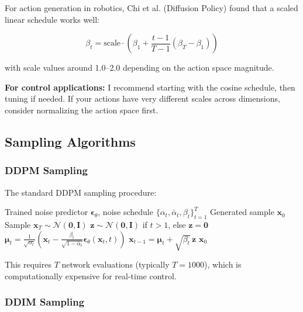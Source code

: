 For action generation in robotics, Chi et al. (Diffusion Policy) found that a scaled linear schedule works well:

\begin{equation}
\beta_t = \text{scale} \cdot \left(\beta_1 + \frac{t-1}{T-1}(\beta_T - \beta_1)\right)
\label{eq:scaled_linear}
\end{equation}

with scale values around 1.0--2.0 depending on the action space magnitude.

\textbf{For control applications:} I recommend starting with the cosine schedule, then tuning if needed. If your actions have very different scales across dimensions, consider normalizing the action space first.

\subsection{Sampling Algorithms}
\label{subsec:sampling_algorithms}

\subsubsection{DDPM Sampling}

The standard DDPM sampling procedure:

\begin{algorithm}[H]
\caption{DDPM Sampling}
\label{alg:ddpm_sampling}
\begin{algorithmic}[1]
\REQUIRE Trained noise predictor $\boldsymbol{\epsilon}_\theta$, noise schedule $\{\alpha_t, \bar{\alpha}_t, \beta_t\}_{t=1}^T$
\ENSURE Generated sample $\mathbf{x}_0$
\STATE Sample $\mathbf{x}_T \sim \mathcal{N}(\mathbf{0}, \mathbf{I})$
    \STATE $\mathbf{z} \sim \mathcal{N}(\mathbf{0}, \mathbf{I})$ if $t > 1$, else $\mathbf{z} = \mathbf{0}$
    \STATE $\boldsymbol{\mu}_t = \frac{1}{\sqrt{\alpha_t}}\left(\mathbf{x}_t - \frac{\beta_t}{\sqrt{1-\bar{\alpha}_t}}\boldsymbol{\epsilon}_\theta(\mathbf{x}_t, t)\right)$
    \STATE $\mathbf{x}_{t-1} = \boldsymbol{\mu}_t + \sqrt{\beta_t}\,\mathbf{z}$
\ENDFOR
\RETURN $\mathbf{x}_0$
\end{algorithmic}
\end{algorithm}

This requires $T$ network evaluations (typically $T = 1000$), which is computationally expensive for real-time control.

\subsubsection{DDIM Sampling}

